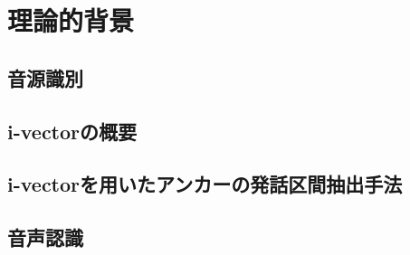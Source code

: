 \chapter{理論的背景}

\section{音源識別}


\section{i-vectorの概要}


\section{i-vectorを用いたアンカーの発話区間抽出手法}


\section{音声認識}

